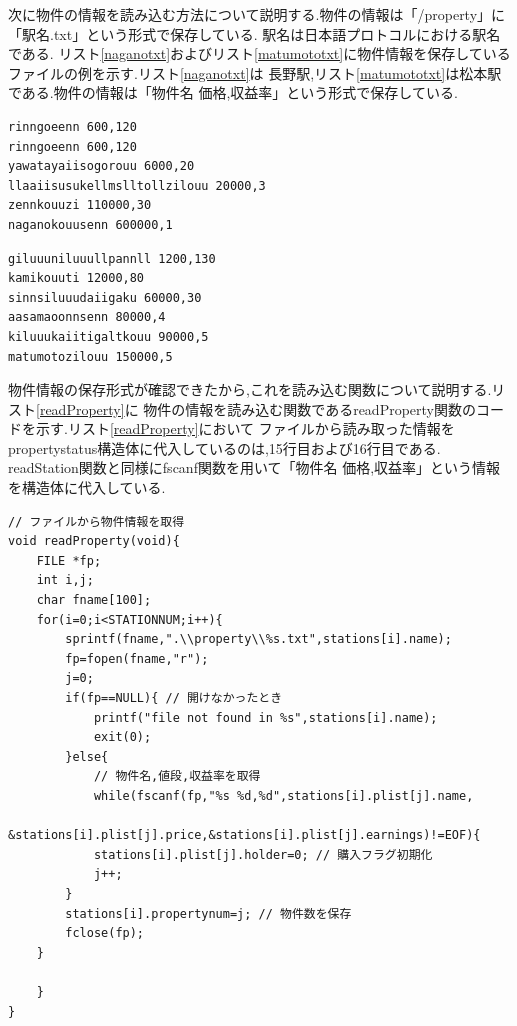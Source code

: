 \documentclass[a4j]{jarticle}
\begin{document}
    次に物件の情報を読み込む方法について説明する.物件の情報は「/property」に「駅名.txt」という形式で保存している.
    駅名は日本語プロトコルにおける駅名である.
    リスト\ref{naganotxt}およびリスト\ref{matumototxt}に物件情報を保存しているファイルの例を示す.リスト\ref{naganotxt}は
    長野駅,リスト\ref{matumototxt}は松本駅である.物件の情報は「物件名 価格,収益率」という形式で保存している.
\begin{lstlisting}[basicstyle=\ttfamily\footnotesize, frame=single,label=naganotxt,caption=/property/nagano.txt]
rinngoeenn 600,120
rinngoeenn 600,120
yawatayaiisogorouu 6000,20 
llaaiisusukellmslltollzilouu 20000,3 
zennkouuzi 110000,30
naganokouusenn 600000,1
\end{lstlisting}  

\begin{lstlisting}[basicstyle=\ttfamily\footnotesize, frame=single,label=matumototxt,caption=/property/matumoto.txt]
giluuuniluuullpannll 1200,130 
kamikouuti 12000,80
sinnsiluuudaiigaku 60000,30
aasamaoonnsenn 80000,4
kiluuukaiitigaltkouu 90000,5
matumotozilouu 150000,5
\end{lstlisting}     

    物件情報の保存形式が確認できたから,これを読み込む関数について説明する.リスト\ref{readProperty}に
    物件の情報を読み込む関数であるreadProperty関数のコードを示す.リスト\ref{readProperty}において
    ファイルから読み取った情報をpropertystatus構造体に代入しているのは,15行目および16行目である.
    readStation関数と同様にfscanf関数を用いて「物件名 価格,収益率」という情報を構造体に代入している.
    \begin{lstlisting}[basicstyle=\ttfamily\footnotesize, frame=single,label=readProperty,caption=readProperty関数]
// ファイルから物件情報を取得
void readProperty(void){
    FILE *fp;
    int i,j;
    char fname[100];
    for(i=0;i<STATIONNUM;i++){
        sprintf(fname,".\\property\\%s.txt",stations[i].name);
        fp=fopen(fname,"r");
        j=0;
        if(fp==NULL){ // 開けなかったとき
            printf("file not found in %s",stations[i].name);
            exit(0);
        }else{
            // 物件名,値段,収益率を取得
            while(fscanf(fp,"%s %d,%d",stations[i].plist[j].name,
            &stations[i].plist[j].price,&stations[i].plist[j].earnings)!=EOF){
            stations[i].plist[j].holder=0; // 購入フラグ初期化
            j++;
        }
        stations[i].propertynum=j; // 物件数を保存
        fclose(fp);
    }

    }   
}
                \end{lstlisting}     
\end{document}
